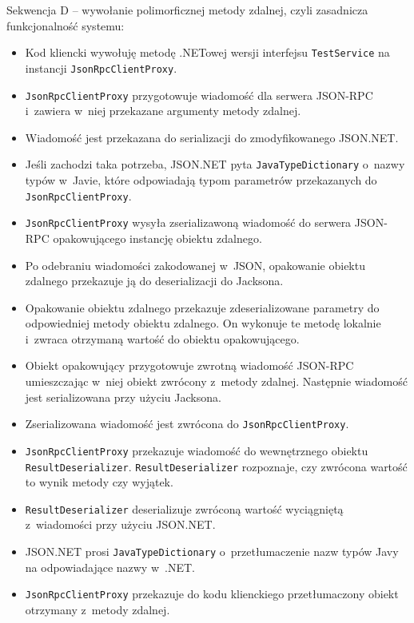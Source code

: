 Sekwencja D -- wywołanie polimorficznej metody zdalnej, czyli zasadnicza funkcjonalność systemu:
\begin{itemize}
	\item Kod kliencki wywołuję metodę .NETowej wersji interfejsu \texttt{TestService} na instancji \texttt{JsonRpcClientProxy}.
	\item \texttt{JsonRpcClientProxy} przygotowuje wiadomość dla serwera JSON-RPC i~zawiera w~niej przekazane argumenty metody zdalnej.
	\item Wiadomość jest przekazana do serializacji do zmodyfikowanego JSON.NET.
	\item Jeśli zachodzi taka potrzeba, JSON.NET pyta \texttt{JavaTypeDictionary} o~nazwy typów w~Javie, które odpowiadają typom parametrów przekazanych do \texttt{JsonRpcClientProxy}.
	\item \texttt{JsonRpcClientProxy} wysyła zserializawoną wiadomość do serwera JSON-RPC opakowującego instancję obiektu zdalnego.
	\item Po odebraniu wiadomości zakodowanej w~JSON, opakowanie obiektu zdalnego przekazuje ją do deserializacji do Jacksona.
	\item Opakowanie obiektu zdalnego przekazuje zdeserializowane parametry do odpowiedniej metody obiektu zdalnego. On wykonuje te metodę lokalnie i~zwraca otrzymaną wartość do obiektu opakowującego.
	\item Obiekt opakowujący przygotowuje zwrotną wiadomość JSON-RPC umieszczając w~niej obiekt zwrócony z~metody zdalnej. Następnie wiadomość jest serializowana przy użyciu Jacksona.
	\item Zserializowana wiadomość jest zwrócona do \texttt{JsonRpcClientProxy}.
	\item \texttt{JsonRpcClientProxy} przekazuje wiadomość do wewnętrznego obiektu \texttt{ResultDeserializer}. \texttt{ResultDeserializer} rozpoznaje, czy zwrócona wartość to wynik metody czy wyjątek.
	\item \texttt{ResultDeserializer} deserializuje zwróconą wartość wyciągniętą z~wiadomości przy użyciu JSON.NET.
	\item JSON.NET prosi \texttt{JavaTypeDictionary} o~przetłumaczenie nazw typów Javy na odpowiadające nazwy w~.NET.
	\item \texttt{JsonRpcClientProxy} przekazuje do kodu klienckiego przetłumaczony obiekt otrzymany z~metody zdalnej.
\end{itemize}



